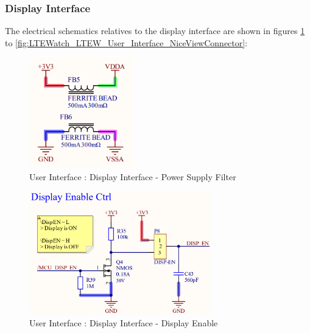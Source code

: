 \documentclass[report.tex]{subfiles}
\begin{document}
\subsubsection{Display Interface}

The electrical schematics relatives to the display interface are shown in figures \ref{fig:LTEWatch_LTEW_User_Interface_Filter_Power_Supply} to \ref{fig:LTEWatch_LTEW_User_Interface_NiceViewConnector}:

\begin{figure}[H]
	\centering
	\includegraphics[width=0.4\textwidth]{Include/Figure/Hardware/LTEWatch_LTEW_User_Interface_Filter_Power_Supply}
	\caption{User Interface : Display Interface - Power Supply Filter}
	\label{fig:LTEWatch_LTEW_User_Interface_Filter_Power_Supply}
\end{figure}

\begin{figure}[H]
	\centering
	\includegraphics[width=0.7\textwidth]{Include/Figure/Hardware/LTEWatch_LTEW_User_Interface_Display_En_CTRL}
	\caption{User Interface : Display Interface - Display Enable}
	\label{fig:LTEWatch_LTEW_User_Interface_Display_En_CTRL}
\end{figure}
\end{document}
